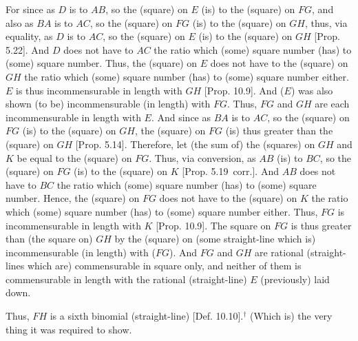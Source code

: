 \begin{Parallel}{}{}
{For since as $D$ is to $AB$, so the (square) on $E$ (is) to the (square) on
$FG$, and also as $BA$ is to $AC$, so the (square) on $FG$ (is) to
the (square) on $GH$, thus, via equality, as $D$ is to $AC$, so
the (square) on $E$ (is) to the (square) on $GH$ [Prop. 5.22]. And $D$ does not have to $AC$ the
ratio which (some) square number (has) to (some) square number.  Thus, 
the (square) on $E$ does not have to the (square) on $GH$ the ratio
which (some) square number (has) to (some) square number either. $E$
is thus incommensurable in length with $GH$ [Prop. 10.9]. And ($E$) was also shown (to be)
incommensurable (in length) with $FG$.  Thus,  $FG$ and $GH$ are
each incommensurable in length with $E$. And since as $BA$ is to $AC$, 
so the (square) on $FG$ (is) to the (square) on $GH$, the (square) on $FG$ (is) thus greater than the (square) on $GH$ [Prop. 5.14]. Therefore, let (the sum of) the
(squares) on $GH$ and $K$ be equal to the (square) on $FG$. Thus,
via conversion, as $AB$ (is) to $BC$,
 so the (square) on $FG$ (is) to the
(square) on $K$ [Prop. 5.19~corr.].  And $AB$ does not
have to $BC$ the ratio which (some) square number (has) to (some) square number. Hence, the (square) on $FG$ does not have to the (square) on
$K$ the ratio which (some) square number (has) to (some) square number either. Thus, $FG$ is incommensurable in length with $K$ [Prop. 10.9]. The square on $FG$ is thus
greater than (the square on) $GH$ by the (square) on (some straight-line which is) incommensurable (in length) with ($FG$). And  $FG$ and $GH$ are rational
(straight-lines which are) commensurable in square only, and neither of them
is commensurable in length with the  rational (straight-line) $E$ (previously)
laid down.

Thus, $FH$ is a  sixth binomial (straight-line) [Def. 10.10].$^\dag$ (Which is) the very thing it was required to show.}
\end{Parallel}



